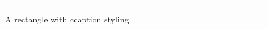 \documentclass{article}
\begin{document}
\begin{figure}
\centering
\rule{4cm}{2cm}
\caption{A rectangle with ccaption styling.}
\end{figure}
\end{document}
